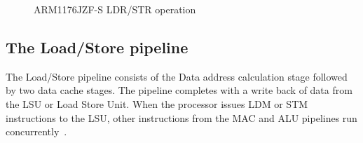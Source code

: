 \documentclass[11pt]{report}
\begin{document}
\begin{figure}[H]
\caption{ARM1176JZF-S LDR/STR operation }
\end{figure}
\subsection{The Load/Store pipeline}
\begin{onehalfspace}
The Load/Store pipeline consists of the Data address calculation stage followed by two data cache stages. The pipeline completes with a write back of data from the LSU or Load Store Unit. When the processor issues LDM or STM instructions to the LSU, other instructions from the MAC and ALU pipelines run concurrently~\citep[1-11]{arm1176jzf-s}. 
\end{onehalfspace}
\end{document}
